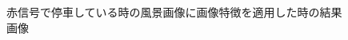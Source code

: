 \documentclass[titlepage,dvipdfmx]{jsarticle}
\begin{document}
\begin{figure}[H]
\begin{tabular}{cc}
  \end{tabular}
  \caption{赤信号で停車している時の風景画像に画像特徴を適用した時の結果画像}
  \label{400Fimg}
\end{figure}
\end{document}
